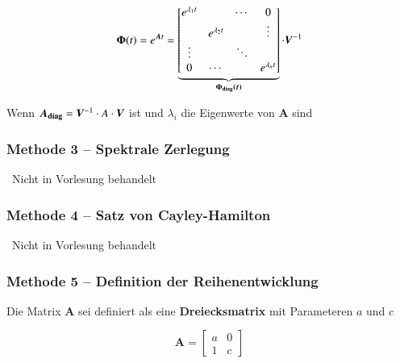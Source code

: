 \begin{minipage}[c]{0.6\columnwidth}
    $$ \bm{\Phi}(t) = e^{\bm{A} t} = \underbrace{ 
    \begin{bmatrix*} 
        e^{\lambda_1 t} &                   & \cdots        & 0      \\
                        & e^{\lambda_2 t}   &               & \vdots \\
        \vdots          &                   & \ddots        &        \\
        0               & \cdots            &               & e^{\lambda_n t}
\end{bmatrix*}}_{\bm{\Phi_{\rm diag}(t)}} \cdot \bm{V}^{-1} $$
\end{minipage}
\hfill
\begin{minipage}[c]{0.36\columnwidth}
    Wenn $\bm{A_{\rm diag}} = \bm{V}^{-1} \cdot A \cdot \bm{V}$ ist und $\lambda_i$ die Eigenwerte von $\bm{A}$ sind
\end{minipage}


\subsubsection{Methode 3 -- Spektrale Zerlegung}

\textrightarrow\ Nicht in Vorlesung behandelt


\subsubsection{Methode 4 -- Satz von Cayley-Hamilton}
\textrightarrow\ Nicht in Vorlesung behandelt


\subsubsection{Methode 5 -- Definition der Reihenentwicklung}


\begin{minipage}[c]{0.6\columnwidth}
    Die Matrix $\bm{A}$ sei definiert als eine \textbf{Dreiecksmatrix} mit Parameteren $a$ und $c$
\end{minipage}
\hfill
\begin{minipage}[c]{0.38\columnwidth}
    $$ \bm{A} = \begin{bmatrix*} a & 0 \\ 1 & c \end{bmatrix*} $$
\end{minipage}


